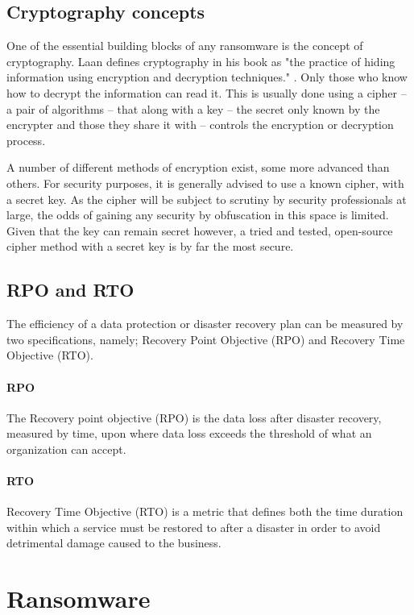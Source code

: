 \subsection{Cryptography concepts}
One of the essential building blocks of any ransomware is the concept of cryptography. Laan defines cryptography in his book as "the practice of hiding information using encryption and decryption techniques." \cite{laan_it_2017}. Only those who know how to decrypt the information can read it. This is usually done using a cipher -- a pair of algorithms -- that along with a key -- the secret only known by the encrypter and those they share it with -- controls the encryption or decryption process. 

A number of different methods of encryption exist, some more advanced than others. For security purposes, it is generally advised to use a known cipher, with a secret key. As the cipher will be subject to scrutiny by security professionals at large, the odds of gaining any security by obfuscation in this space is limited. Given that the key can remain secret however, a tried and tested, open-source cipher method with a secret key is by far the most secure. 

\subsection{RPO and RTO} 
The efficiency of a data protection or disaster recovery plan can be 
measured by two specifications, namely;
Recovery Point Objective (RPO) and Recovery Time Objective (RTO).

\paragraph{RPO}\label{theory:rpo}
The Recovery point objective (RPO) is the data loss after disaster recovery, measured by time, upon where data loss exceeds the threshold of what an organization can accept.

\paragraph{RTO} \label{theory:rto}
Recovery Time Objective (RTO) is a metric that 
defines both the time duration within which a service must be restored to after a 
disaster in order to avoid detrimental damage caused to the business. 

\section{Ransomware}
\label{Ransomware}

